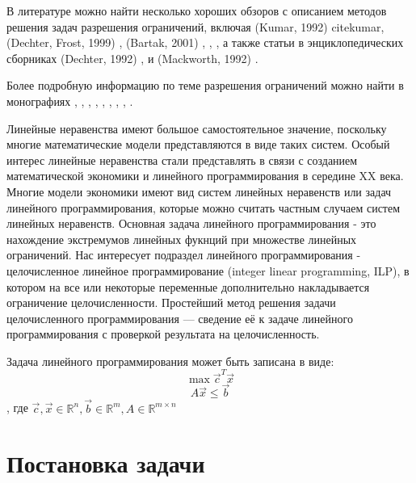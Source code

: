 \documentclass[a4paper,14pt,russian]{extreport}
\begin{document}
\par 
В литературе можно найти несколько хороших обзоров с описанием методов решения задач разрешения ограничений, включая (Kumar, 1992) cite{kumar}, (Dechter, Frost, 1999) \cite{dechter_frost}, (Bartak, 2001) \cite{bartak}, \cite{meseguer}, \cite{miguel}, а также статьи в энциклопедических сборниках (Dechter, 1992) \cite{dechter_networks}, \cite{hower} и (Mackworth, 1992) \cite{mackworth}.
\par 
Более подробную информацию по теме разрешения ограничений можно найти в монографиях \cite{apt}, \cite{dechter}, \cite{fruehwirth}, \cite{marriott}, \cite{rossi}, \cite{hentenryck}, \cite{hentenryck_michel_deville}, \cite{hentenryck_opl}, \cite{hentenryck_michel}. 
\par 
Линейные неравенства имеют большое самостоятельное значение, поскольку многие математические модели представляются в виде таких систем. Особый интерес линейные неравенства стали представлять в связи с созданием математической экономики \cite{kantorovich} и линейного программирования в середине XX века. Многие модели экономики имеют вид систем линейных неравенств или задач линейного программирования, которые можно считать частным случаем систем линейных неравенств. Основная задача линейного программирования - это нахождение экстремумов линейных фукнций при множестве линейных ограничений. Нас интересует подраздел линейного программирования - целочисленное линейное программирование (integer linear programming, ILP), в котором на все или некоторые переменные дополнительно накладывается ограничение целочисленности. Простейший метод решения задачи целочисленного программирования — сведение её к задаче линейного программирования с проверкой результата на целочисленность.
\par
Задача линейного программирования может быть записана в виде:
$$\max \vec c^T \vec x$$
$$A\vec x \leq \vec b$$, где $\vec c, \vec x \in \mathbb{R}^n, \vec b \in \mathbb{R}^m, A \in \mathbb{R}^{m\times n}$

\section{Постановка задачи}
\end{document}

